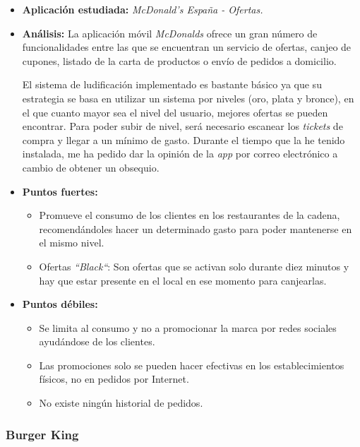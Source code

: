 \documentclass[twoside]{report}
\begin{document}
\begin{itemize}
\item \textbf{Aplicación estudiada:} \cite{mcdo} \textit{McDonald's España - Ofertas.}
\item \textbf{Análisis:} 
La aplicación móvil \textit{McDonalds} ofrece un gran número de funcionalidades entre las que se encuentran un servicio de ofertas, canjeo de cupones, listado de la carta de productos o envío de pedidos a domicilio. 

El sistema de ludificación implementado es bastante básico ya que su estrategia se basa en utilizar un sistema por niveles (oro, plata y bronce), en el que cuanto mayor sea el nivel del usuario, mejores ofertas se pueden encontrar. Para poder subir de nivel, será necesario escanear los \textit{tickets} de compra y llegar a un mínimo de gasto. Durante el tiempo que la he tenido instalada, me ha pedido dar la opinión de la \textit{app} por correo electrónico a cambio de obtener un obsequio.

\item \textbf{Puntos fuertes:}
	\begin{itemize}
	\item Promueve el consumo de los clientes en los restaurantes de la cadena, recomendándoles hacer un determinado gasto para poder mantenerse en el mismo nivel.
	\item Ofertas \textit{“Black“}: Son ofertas que se activan solo durante diez minutos y hay que estar presente en el local en ese momento para canjearlas.
	\end{itemize}
\item \textbf{Puntos débiles:}
	\begin{itemize}
	\item Se limita al consumo y no a promocionar la marca por redes sociales ayudándose de los clientes.
	\item Las promociones solo se pueden hacer efectivas en los establecimientos físicos, no en pedidos por Internet.
	\item No existe ningún historial de pedidos.
	\end{itemize}
\end{itemize}


\subsubsection{Burger King}
\end{document}
